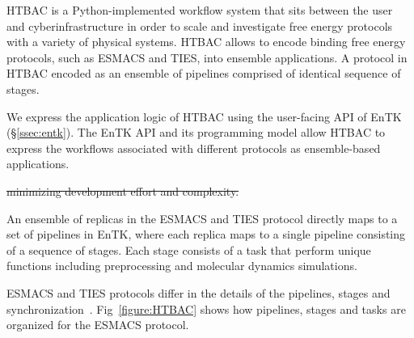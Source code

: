 HTBAC is a Python-implemented workflow system  that sits between the
user and cyberinfrastructure  in order to scale  and
investigate free energy protocols with a variety of physical systems. HTBAC
allows to encode binding free energy protocols, such as ESMACS and TIES, into
ensemble applications\@. A protocol in HTBAC encoded as an ensemble of
pipelines comprised of identical sequence of stages.

 

We express the application logic of HTBAC using the user-facing API of EnTK
(\S\ref{ssec:entk}). The EnTK API and its programming model allow HTBAC to
express the workflows associated with different protocols as ensemble-based
applications.

 \st{minimizing development effort and complexity.}


An ensemble of replicas in the ESMACS and TIES protocol directly maps to a set of
pipelines in EnTK, where each replica maps to a single pipeline consisting of
a sequence of stages. Each stage consists of a task
 that perform unique functions including preprocessing and
molecular dynamics simulations. 

ESMACS and TIES protocols differ in the details of the pipelines, stages and
synchronization~\cite{Bhati2017}. 
Fig~\ref{figure:HTBAC} %
shows how pipelines, stages and tasks are organized for the ESMACS
protocol.

